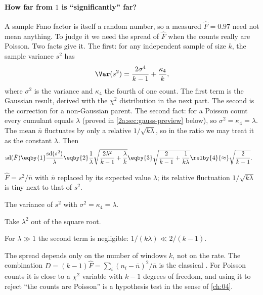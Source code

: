 \paragraph{How far from $1$ is ``significantly'' far?} A sample Fano factor is itself a random number, so a measured $\hat F=0.97$ need not mean anything. To judge it we need the spread of $\hat F$ when the counts really are Poisson. Two facts give it. The first: for any independent sample of size $k$, the sample variance $s^2$ has
\[
  \Var(s^2)=\frac{2\sigma^4}{k-1}+\frac{\kappa_4}{k},
\]
where $\sigma^2$ is the variance and $\kappa_4$ the fourth   of one count. The first term is the Gaussian result, derived with the $\chi^2$ distribution in the next part. The second is the correction for a non-Gaussian parent. The second fact: for a Poisson count every cumulant equals $\lambda$ (proved in \cref{2a:sec:gauss-preview} below), so $\sigma^2=\kappa_4=\lambda$. The mean $\bar n$ fluctuates by only a relative $1/\sqrt{k\lambda}$, so in the ratio we may treat it as the constant $\lambda$. Then
\begin{align}
  \mathrm{sd}(\hat F)
  &\eqby{1} \frac{\mathrm{sd}(s^2)}{\lambda}
  \eqby{2} \frac1\lambda\sqrt{\frac{2\lambda^2}{k-1}+\frac{\lambda}{k}}
  \eqby{3} \sqrt{\frac{2}{k-1}+\frac{1}{k\lambda}}
  \relby{4}{\approx} \sqrt{\frac{2}{k-1}} . \label{2a:eq:fanosd}
\end{align}
\begin{explain}
  \item $\hat F=s^2/\bar n$ with $\bar n$ replaced by its expected value $\lambda$; its relative fluctuation $1/\sqrt{k\lambda}$ is tiny next to that of $s^2$.
  \item The variance of $s^2$ with $\sigma^2=\kappa_4=\lambda$.
  \item Take $\lambda^2$ out of the square root.
  \item For $\lambda\gg1$ the second term is negligible: $1/(k\lambda)\ll2/(k-1)$.
\end{explain}
The spread depends only on the number of windows $k$, not on the rate. The combination $D=(k-1)\hat F=\sum_i(n_i-\bar n)^2/\bar n$ is the classical . For Poisson counts it is close to a $\chi^2$ variable with $k-1$ degrees of freedom, and using it to reject ``the counts are Poisson'' is a hypothesis test in the sense of \cref{ch:04}.

